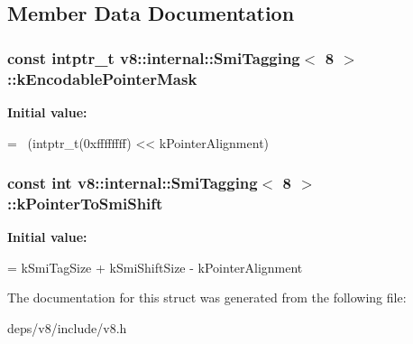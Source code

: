 \subsection{Member Data Documentation}
\hypertarget{structv8_1_1internal_1_1_smi_tagging_3_018_01_4_aca0bc5e4db4a17be008d594dfd817ca5}{}
\subsubsection[{k\+Encodable\+Pointer\+Mask}]{\setlength{\rightskip}{0pt plus 5cm}const intptr\+\_\+t {\bf v8\+::internal\+::\+Smi\+Tagging}$<$ 8 $>$\+::k\+Encodable\+Pointer\+Mask\hspace{0.3cm}{\ttfamily [static]}}\label{structv8_1_1internal_1_1_smi_tagging_3_018_01_4_aca0bc5e4db4a17be008d594dfd817ca5}
{\bfseries Initial value\+:}
\begin{DoxyCode}
=
      ~(intptr\_t(0xffffffff) << kPointerAlignment)
\end{DoxyCode}
\hypertarget{structv8_1_1internal_1_1_smi_tagging_3_018_01_4_adc8e3201cd2bc34b2119251edacb0c8a}{}
\subsubsection[{k\+Pointer\+To\+Smi\+Shift}]{\setlength{\rightskip}{0pt plus 5cm}const int {\bf v8\+::internal\+::\+Smi\+Tagging}$<$ 8 $>$\+::k\+Pointer\+To\+Smi\+Shift\hspace{0.3cm}{\ttfamily [static]}}\label{structv8_1_1internal_1_1_smi_tagging_3_018_01_4_adc8e3201cd2bc34b2119251edacb0c8a}
{\bfseries Initial value\+:}
\begin{DoxyCode}
=
      kSmiTagSize + kSmiShiftSize - kPointerAlignment
\end{DoxyCode}


The documentation for this struct was generated from the following file\+:\begin{DoxyCompactItemize}
\item 
deps/v8/include/v8.\+h\end{DoxyCompactItemize}
